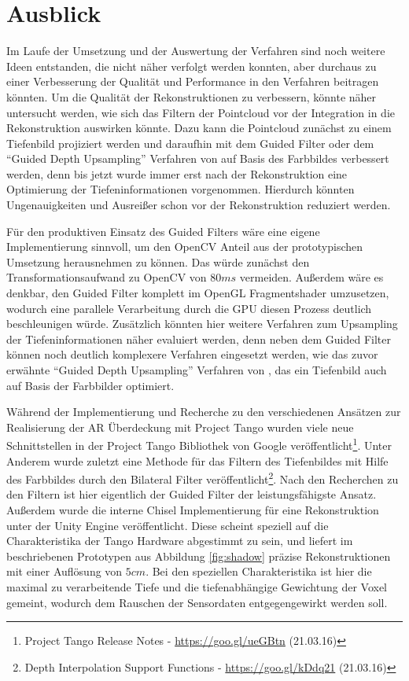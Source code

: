\section{Ausblick}

Im Laufe der Umsetzung und der Auswertung der Verfahren sind noch weitere Ideen entstanden, die nicht näher verfolgt werden konnten, aber durchaus zu einer Verbesserung der Qualität und Performance in den Verfahren beitragen könnten. Um die Qualität der Rekonstruktionen zu verbessern, könnte näher untersucht werden, wie sich das Filtern der Pointcloud vor der Integration in die Rekonstruktion auswirken könnte. Dazu kann die Pointcloud zunächst zu einem Tiefenbild projiziert werden und daraufhin mit dem Guided Filter oder dem \enquote{Guided Depth Upsampling} Verfahren von \citet{Ferstl_2013_ICCV} auf Basis des Farbbildes verbessert werden, denn bis jetzt wurde immer erst nach der Rekonstruktion eine Optimierung der Tiefeninformationen vorgenommen. Hierdurch könnten Ungenauigkeiten und Ausreißer schon vor der Rekonstruktion reduziert werden. 

Für den produktiven Einsatz des Guided Filters wäre eine eigene Implementierung sinnvoll, um den OpenCV Anteil aus der prototypischen Umsetzung herausnehmen zu können. Das würde zunächst den Transformationsaufwand zu OpenCV von \(80 ms\) vermeiden. Außerdem wäre es denkbar, den Guided Filter komplett im OpenGL Fragmentshader umzusetzen, wodurch eine parallele Verarbeitung durch die GPU diesen Prozess deutlich beschleunigen würde. Zusätzlich könnten hier weitere Verfahren zum Upsampling der Tiefeninformationen näher evaluiert werden, denn neben dem Guided Filter können noch deutlich komplexere Verfahren eingesetzt werden, wie das zuvor erwähnte \enquote{Guided Depth Upsampling} Verfahren von \citet{Ferstl_2013_ICCV}, das ein Tiefenbild auch auf Basis der Farbbilder optimiert. 

Während der Implementierung und Recherche zu den verschiedenen Ansätzen zur Realisierung der AR Überdeckung mit Project Tango wurden viele neue Schnittstellen in der Project Tango Bibliothek von Google veröffentlicht\footnote{Project Tango Release Notes - \url{https://goo.gl/ueGBtn} (21.03.16)}.  Unter Anderem wurde zuletzt eine Methode für das Filtern des Tiefenbildes mit Hilfe des Farbbildes durch den Bilateral Filter veröffentlicht\footnote{Depth Interpolation Support Functions - \url{https://goo.gl/kDdq21} (21.03.16)}. Nach den Recherchen zu den Filtern ist hier eigentlich der Guided Filter der leistungsfähigste Ansatz. Außerdem wurde die interne Chisel Implementierung für eine Rekonstruktion unter der Unity Engine veröffentlicht. Diese scheint speziell auf die Charakteristika der Tango Hardware abgestimmt zu sein, und liefert im beschriebenen Prototypen aus Abbildung \ref{fig:shadow} präzise Rekonstruktionen mit einer Auflösung von \(5cm\). Bei den speziellen Charakteristika ist hier die maximal zu verarbeitende Tiefe und die tiefenabhängige Gewichtung der Voxel gemeint, wodurch dem Rauschen der Sensordaten entgegengewirkt werden soll.

